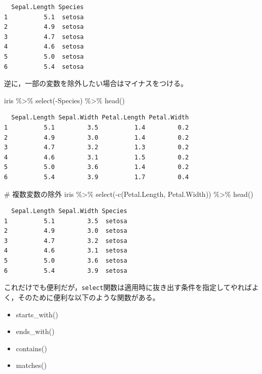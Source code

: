 \documentclass[
  a4paper,
]{ltjsbook}
\newenvironment{Shaded}{\begin{snugshade}}{\end{snugshade}}
\newcommand{\CommentTok}[1]{\textcolor[rgb]{0.37,0.37,0.37}{#1}}
\newcommand{\FunctionTok}[1]{\textcolor[rgb]{0.28,0.35,0.67}{#1}}
\newcommand{\NormalTok}[1]{\textcolor[rgb]{0.00,0.23,0.31}{#1}}
\newcommand{\SpecialCharTok}[1]{\textcolor[rgb]{0.37,0.37,0.37}{#1}}
\providecommand{\tightlist}{%
  \setlength{\itemsep}{0pt}\setlength{\parskip}{0pt}}\usepackage{longtable,booktabs,array}
\begin{document}
\begin{verbatim}
  Sepal.Length Species
1          5.1  setosa
2          4.9  setosa
3          4.7  setosa
4          4.6  setosa
5          5.0  setosa
6          5.4  setosa
\end{verbatim}

逆に，一部の変数を除外したい場合はマイナスをつける。

\begin{Shaded}
\begin{Highlighting}[]
\NormalTok{iris }\SpecialCharTok{\%\textgreater{}\%} \FunctionTok{select}\NormalTok{(}\SpecialCharTok{{-}}\NormalTok{Species) }\SpecialCharTok{\%\textgreater{}\%} \FunctionTok{head}\NormalTok{()}
\end{Highlighting}
\end{Shaded}

\begin{verbatim}
  Sepal.Length Sepal.Width Petal.Length Petal.Width
1          5.1         3.5          1.4         0.2
2          4.9         3.0          1.4         0.2
3          4.7         3.2          1.3         0.2
4          4.6         3.1          1.5         0.2
5          5.0         3.6          1.4         0.2
6          5.4         3.9          1.7         0.4
\end{verbatim}

\begin{Shaded}
\begin{Highlighting}[]
\CommentTok{\# 複数変数の除外}
\NormalTok{iris }\SpecialCharTok{\%\textgreater{}\%} \FunctionTok{select}\NormalTok{(}\SpecialCharTok{{-}}\FunctionTok{c}\NormalTok{(Petal.Length, Petal.Width)) }\SpecialCharTok{\%\textgreater{}\%} \FunctionTok{head}\NormalTok{()}
\end{Highlighting}
\end{Shaded}

\begin{verbatim}
  Sepal.Length Sepal.Width Species
1          5.1         3.5  setosa
2          4.9         3.0  setosa
3          4.7         3.2  setosa
4          4.6         3.1  setosa
5          5.0         3.6  setosa
6          5.4         3.9  setosa
\end{verbatim}

これだけでも便利だが，\texttt{select}関数は適用時に抜き出す条件を指定してやればよく，そのために便利な以下のような関数がある。

\begin{itemize}
\tightlist
\item
  starts\_with()
\item
  ends\_with()
\item
  contains()
\item
  matches()
\end{itemize}
\end{document}
